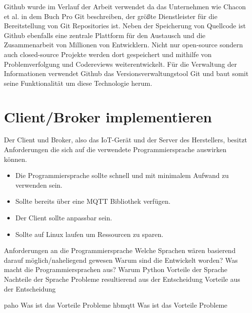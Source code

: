 Github wurde im Verlauf der Arbeit verwendet da das Unternehmen wie Chacon et al. in dem Buch Pro Git \cite{Chacon2014} beschreiben, der größte Dienstleister für die Bereitstellung von Git Repositories ist. Neben der Speicherung von Quellcode ist Github ebenfalls eine zentrale Plattform für den Austausch und die Zusammenarbeit von Millionen von Entwicklern. Nicht nur open-source sondern auch closed-source Projekte werden dort gespeichert und mithilfe von Problemverfolgung und Codereviews weiterentwickelt. Für die Verwaltung der Informationen verwendet Github das Versionsverwaltungstool Git und baut somit seine Funktionalität um diese Technologie herum.

\section{Client/Broker implementieren}

    Der Client und Broker, also das \ac{IoT}-Gerät und der Server des Herstellers, besitzt Anforderungen die sich auf die verwendete Programmiersprache auswirken können.
    \begin{itemize}
        \item Die Programmiersprache sollte schnell und mit minimalem Aufwand zu verwenden sein.
        \item Sollte bereits über eine \ac{MQTT} Bibliothek verfügen.
        \item Der Client sollte anpassbar sein.
        \item Sollte auf Linux laufen um Ressourcen zu sparen.
    \end{itemize}
        Anforderungen an die Programmiersprache
        Welche Sprachen wären basierend darauf möglich/naheliegend gewesen
            Warum sind die Entwickelt worden? 
            Was macht die Programmiersprachen aus?
        Warum Python
            Vorteile der Sprache
            Nachteile der Sprache 
            Probleme resultierend aus der Entscheidung
            Vorteile aus der Entscheidung
    
    paho
        Was ist das
        Vorteile
        Probleme
    hbmqtt
        Was ist das
        Vorteile
        Probleme
            
